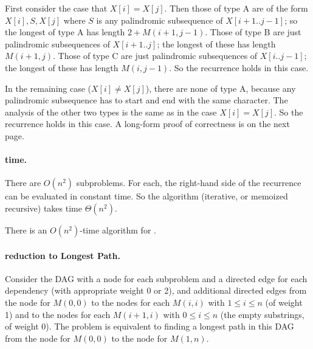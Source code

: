 First consider the case that $X[i] = X[j]$.
Then those of type A are of the form $X[i], S, X[j]$
where $S$ is any palindromic subsequence of $X[i+1..j-1]$;
so the longest of type A has length $2+M(i+1, j-1)$.  
Those of type B are just palindromic subsequences of $X[i+1..j]$;
the longest of these has length $M(i+1, j)$.
Those of type C are just palindromic subsequences of $X[i..j-1]$;
the longest of these has length $M(i, j-1)$.
So the recurrence holds in this case.

In the remaining case ($X[i] \ne X[j]$),
there are none of type A, because any palindromic subsequence
has to start and end with the same character.
The analysis of the other two types is the same as in the case $X[i] = X[j]$.
So the recurrence holds in this case.
A long-form proof of correctness is on the next page.

\paragraph{time.}
There are $O(n^2)$ subproblems.
For each, the right-hand side of the recurrence can be evaluated in constant time.
So the algorithm (iterative, or memoized recursive) takes time $\Theta(n^2)$.

\begin{theorem}
  There is an $O(n^2)$-time algorithm for .
\end{theorem}

\paragraph{reduction to Longest Path.}
Consider the DAG with a node for each subproblem
and a directed edge for each dependency (with appropriate weight 0 or 2),
and additional directed edges from the node for $M(0,0)$
to the nodes for each $M(i, i)$ with $1\le i\le n$ (of weight 1)
and to the nodes for each $M(i+1, i)$ with $0\le i\le n$ (the empty substrings, of weight 0).
The problem is equivalent to finding a longest path in this DAG from the node for $M(0,0)$
to the node for $M(1, n)$.

